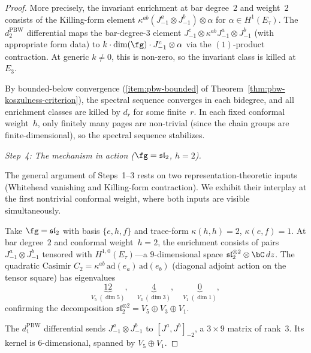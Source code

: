 \begin{proof}
More precisely, the invariant enrichment at bar
degree~$2$ and weight~$2$ consists of the Killing-form
element $\kappa^{ab} (J^a_{-1} \otimes J^b_{-1})
\otimes \alpha$ for
$\alpha \in H^1(E_\tau)$.  The $d_2^{\mathrm{PBW}}$
differential maps the bar-degree-$3$ element
$J^c_{-1} \otimes \kappa^{ab} J^a_{-1} \otimes J^b_{-1}$
(with appropriate form data) to
$k \cdot \dim(\fg) \cdot J^c_{-1} \otimes \alpha$ via the
$(1)$-product contraction.  At generic $k \neq 0$,
this is non-zero, so the invariant class is killed
at~$E_3$.

By bounded-below convergence
(\ref{item:pbw-bounded} of
Theorem~\ref{thm:pbw-koszulness-criterion}), the
spectral sequence converges in each bidegree, and
all enrichment classes are killed by $d_r$ for
some finite~$r$.  In each fixed conformal weight~$h$,
only finitely many pages are non-trivial (since the
chain groups are finite-dimensional), so the spectral
sequence stabilizes.

\medskip
\emph{Step~4: The mechanism in action ($\fg = \mathfrak{sl}_2$, $h = 2$).}

The general argument of Steps~1--3 rests on two
representation-theoretic inputs (Whitehead vanishing and
Killing-form contraction).  We exhibit their interplay
at the first nontrivial conformal weight, where both
inputs are visible simultaneously.

Take $\fg = \mathfrak{sl}_2$ with basis $\{e, h, f\}$ and
trace-form $\kappa(h,h) = 2$, $\kappa(e,f) = 1$.
At bar degree~$2$ and conformal weight~$h = 2$, the enrichment
consists of pairs $J^a_{-1} \otimes J^b_{-1}$ tensored with
$H^{1,0}(E_\tau)$---a $9$-dimensional space
$\mathfrak{sl}_2^{\otimes 2} \otimes \bC\,dz$.
The quadratic Casimir
$C_2 = \kappa^{ab}\,\mathrm{ad}(e_a)\,\mathrm{ad}(e_b)$
(diagonal adjoint action on the tensor square) has eigenvalues
\[
\underbrace{12}_{V_5\; (\dim 5)}, \quad
\underbrace{4}_{V_3\; (\dim 3)}, \quad
\underbrace{0}_{V_1\; (\dim 1)},
\]
confirming the decomposition
$\mathfrak{sl}_2^{\otimes 2} = V_5 \oplus V_3 \oplus V_1$.

The $d_1^{\mathrm{PBW}}$ differential sends
$J^a_{-1} \otimes J^b_{-1}$ to $[J^a, J^b]_{-2}$,
a $3 \times 9$ matrix of rank~$3$.  Its kernel is
$6$-dimensional, spanned by $V_5 \oplus V_1$.


\end{proof}
